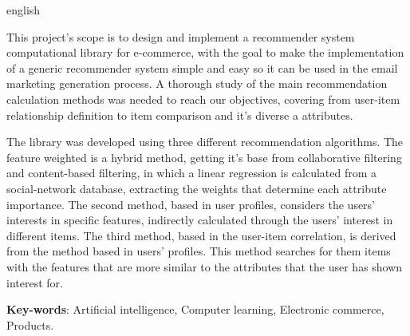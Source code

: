 \setlength{\absparsep}{18pt} %
\begin{resumo}[Abstract]
 \begin{otherlanguage*}{english}

This project's scope is to design and implement a recommender system computational library for e-commerce, with the goal to make the implementation of a generic recommender system simple and easy so it can be used in the email marketing generation process. A thorough study of the main recommendation calculation methods was needed to reach our objectives, covering from user-item relationship definition to item comparison and it's diverse a attributes.

The library was developed using three different recommendation algorithms. The feature weighted is a hybrid method, getting it's base from collaborative filtering and content-based filtering, in which a linear regression is calculated from a social-network database, extracting the weights that determine each attribute importance. The second method, based in user profiles, considers the users' interests in specific features, indirectly calculated through the users' interest in different items. The third method, based in the user-item correlation, is derived from the method based in users' profiles. This method searches for them items with the features that are more similar to the attributes that the user has shown interest for.

   \vspace{\onelineskip}
 
   \noindent 
   \textbf{Key-words}: Artificial intelligence, Computer learning, Electronic commerce, Products.
 \end{otherlanguage*}
\end{resumo}
